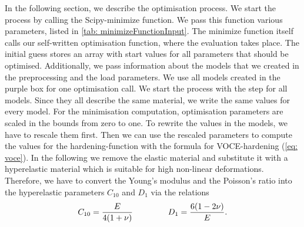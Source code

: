 In the following section, we describe the optimisation process. We start the process by calling the Scipy-minimize function. We pass this function various parameters, listed in \autoref{tab: minimizeFunctionInput}. The minimize function itself calls our self-written optimisation function, where the evaluation takes place. The initial guess stores an array with start values for all parameters that should be optimised. Additionally, we pass information about the models that we created in the preprocessing and the load parameters. We use all models created in the purple box for one optimisation call.
We start the process with the step  for all models. Since they all describe the same material, we write the same values for every model. For the minimisation computation, optimisation parameters are scaled in the bounds from zero to one. To rewrite the values in the models, we have to rescale them first. Then we can use the rescaled parameters to compute the values for the hardening-function with the formula for VOCE-hardening (\autoref{eq: voce}). In the following we remove the elastic material and substitute it with a hyperelastic material which is suitable for high non-linear deformations. Therefore, we have to convert the Young's modulus and the Poisson's ratio into the hyperelastic parameters $C_{10}$ and $D_1$ via the relations
\begin{gather}\label{eq: elasticParams}
    C_{10} = \frac{E}{4(1+ \nu)} \hspace{1.5cm}
    D_1 = \frac{6(1-2\nu)}{E}.
\end{gather}

